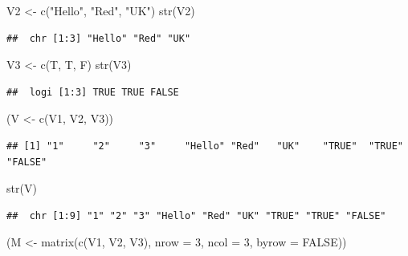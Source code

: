 \documentclass[
]{book}
\newenvironment{Shaded}{\begin{snugshade}}{\end{snugshade}}
\newcommand{\AttributeTok}[1]{\textcolor[rgb]{0.77,0.63,0.00}{#1}}
\newcommand{\ConstantTok}[1]{\textcolor[rgb]{0.00,0.00,0.00}{#1}}
\newcommand{\DecValTok}[1]{\textcolor[rgb]{0.00,0.00,0.81}{#1}}
\newcommand{\FunctionTok}[1]{\textcolor[rgb]{0.00,0.00,0.00}{#1}}
\newcommand{\NormalTok}[1]{#1}
\newcommand{\OtherTok}[1]{\textcolor[rgb]{0.56,0.35,0.01}{#1}}
\newcommand{\StringTok}[1]{\textcolor[rgb]{0.31,0.60,0.02}{#1}}
\theoremstyle{definition}
\theoremstyle{definition}
\theoremstyle{definition}
\theoremstyle{definition}
\theoremstyle{remark}
\begin{document}
\begin{Shaded}
\begin{Highlighting}[]
\NormalTok{V2 }\OtherTok{\textless{}{-}} \FunctionTok{c}\NormalTok{(}\StringTok{"Hello"}\NormalTok{, }\StringTok{"Red"}\NormalTok{, }\StringTok{"UK"}\NormalTok{)}
\FunctionTok{str}\NormalTok{(V2)}
\end{Highlighting}
\end{Shaded}

\begin{verbatim}
##  chr [1:3] "Hello" "Red" "UK"
\end{verbatim}

\begin{Shaded}
\begin{Highlighting}[]
\NormalTok{V3 }\OtherTok{\textless{}{-}} \FunctionTok{c}\NormalTok{(T, T, F)}
\FunctionTok{str}\NormalTok{(V3)}
\end{Highlighting}
\end{Shaded}

\begin{verbatim}
##  logi [1:3] TRUE TRUE FALSE
\end{verbatim}

\begin{Shaded}
\begin{Highlighting}[]
\NormalTok{(V }\OtherTok{\textless{}{-}} \FunctionTok{c}\NormalTok{(V1, V2, V3)) }
\end{Highlighting}
\end{Shaded}

\begin{verbatim}
## [1] "1"     "2"     "3"     "Hello" "Red"   "UK"    "TRUE"  "TRUE"  "FALSE"
\end{verbatim}

\begin{Shaded}
\begin{Highlighting}[]
\FunctionTok{str}\NormalTok{(V)}
\end{Highlighting}
\end{Shaded}

\begin{verbatim}
##  chr [1:9] "1" "2" "3" "Hello" "Red" "UK" "TRUE" "TRUE" "FALSE"
\end{verbatim}

\begin{Shaded}
\begin{Highlighting}[]
\NormalTok{(M }\OtherTok{\textless{}{-}} \FunctionTok{matrix}\NormalTok{(}\FunctionTok{c}\NormalTok{(V1, V2, V3), }\AttributeTok{nrow =} \DecValTok{3}\NormalTok{, }\AttributeTok{ncol =} \DecValTok{3}\NormalTok{, }\AttributeTok{byrow =} \ConstantTok{FALSE}\NormalTok{))}
\end{Highlighting}
\end{Shaded}
\end{document}
